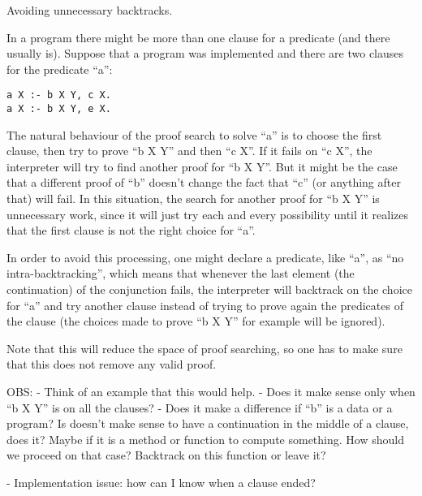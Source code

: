 Avoiding unnecessary backtracks.

In a program there might be more than one clause for a predicate (and there usually is). Suppose that a program was implemented and there are two clauses for the predicate ``a'':

\begin{verbatim}
a X :- b X Y, c X.
a X :- b X Y, e X.
\end{verbatim}

The natural behaviour of the proof search to solve ``a'' is to choose the first clause, then try to prove ``b X Y'' and then ``c X''.  If it fails on ``c X'', the interpreter will try to find another proof for ``b X Y''.  But it might be the case that a different proof of ``b'' doesn't change the fact that ``c'' (or anything after that) will fail. In this situation, the search for another proof for ``b X Y'' is unnecessary work, since it will just try each and every possibility until it realizes that the first clause is not the right choice for ``a''.

In order to avoid this processing, one might declare a predicate, like ``a'', as ``no intra-backtracking'', which means that whenever the last element (the continuation) of the conjunction fails, the interpreter will backtrack on the choice for ``a'' and try another clause instead of trying to prove again the predicates of the clause (the choices made to prove ``b X Y'' for example will be ignored).

Note that this will reduce the space of proof searching, so one has to make sure that this does not remove any valid proof.

OBS:
- Think of an example that this would help.
- Does it make sense only when ``b X Y'' is on all the clauses?
- Does it make a difference if ``b'' is a data or a program? Is doesn't make sense to have a continuation in the middle of a clause, does it? Maybe if it is a method or function to compute something. How should we proceed on that case? Backtrack on this function or leave it?

- Implementation issue: how can I know when a clause ended?